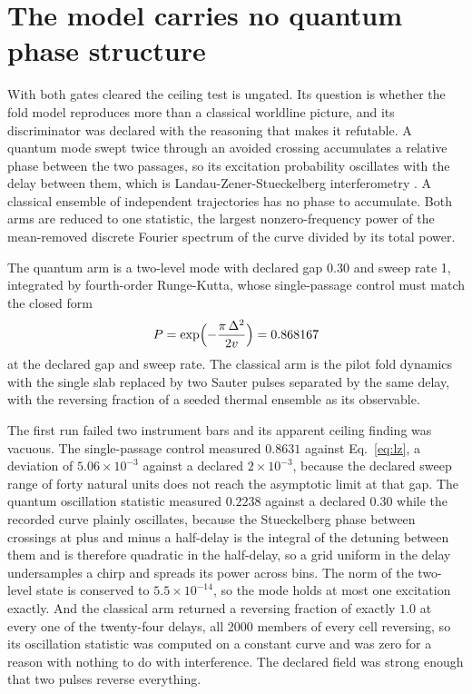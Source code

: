 \documentclass[aps,pre,reprint,nofootinbib,floatfix]{revtex4-2}
\begin{document}
\section{The model carries no quantum phase structure}
\label{sec:pf7}

With both gates cleared the ceiling test is ungated.  Its question is
whether the fold model reproduces more than a classical worldline
picture, and its discriminator was declared with the reasoning that
makes it refutable.  A quantum mode swept twice through an avoided
crossing accumulates a relative phase between the two passages, so its
excitation probability oscillates with the delay between them, which is
Landau-Zener-Stueckelberg interferometry
\cite{Landau1932, Zener1932, Stueckelberg1932, Shevchenko2010}.  A
classical ensemble of independent trajectories has no phase to
accumulate.  Both arms are reduced to one statistic, the largest
nonzero-frequency power of the mean-removed discrete Fourier spectrum
of the curve divided by its total power.

The quantum arm is a two-level mode with declared gap $0.30$ and sweep
rate 1, integrated by fourth-order Runge-Kutta, whose single-passage
control must match the closed form
\begin{equation}
  P = \exp\Bigl(-\frac{\pi\,\Delta^{2}}{2 v}\Bigr) = 0.868167
  \label{eq:lz}
\end{equation}
at the declared gap and sweep rate.  The classical arm is the pilot
fold dynamics with the single slab replaced by two Sauter pulses
separated by the same delay, with the reversing fraction of a seeded
thermal ensemble as its observable.

The first run failed two instrument bars and its apparent ceiling
finding was vacuous.  The single-passage control measured $0.8631$
against Eq.~\eqref{eq:lz}, a deviation of $5.06 \times 10^{-3}$ against
a declared $2 \times 10^{-3}$, because the declared sweep range of
forty natural units does not reach the asymptotic limit at that gap.
The quantum oscillation statistic measured $0.2238$ against a declared
$0.30$ while the recorded curve plainly oscillates, because the
Stueckelberg phase between crossings at plus and minus a half-delay is
the integral of the detuning between them and is therefore quadratic in
the half-delay, so a grid uniform in the delay undersamples a chirp and
spreads its power across bins.  The norm of the two-level state is
conserved to $5.5 \times 10^{-14}$, so the mode holds at most one
excitation exactly.  And the classical arm returned a reversing
fraction of exactly $1.0$ at every one of the twenty-four delays, all
2000 members of every cell reversing, so its oscillation statistic was
computed on a constant curve and was zero for a reason with nothing to
do with interference.  The declared field was strong enough that two
pulses reverse everything.
\end{document}
